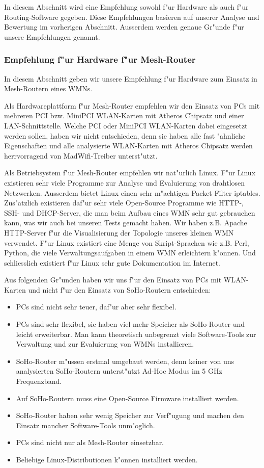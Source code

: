 In diesem Abschnitt wird eine Empfehlung sowohl f"ur Hardware als auch
f"ur Routing-Software gegeben. Diese Empfehlungen basieren auf unserer
Analyse und Bewertung im vorherigen Abschnitt. Ausserdem werden genaue Gr"unde
f"ur unsere Empfehlungen genannt.

\subsubsection{Empfehlung f"ur Hardware f"ur Mesh-Router}

In diesem Abschnitt geben wir unsere Empfehlung f"ur Hardware zum Einsatz in
Mesh-Routern eines WMNs.

Als Hardwareplattform f"ur Mesh-Router empfehlen wir den Einsatz von PCs mit
mehreren PCI bzw. MiniPCI WLAN-Karten mit Atheros Chipsatz und einer
LAN-Schnittstelle. Welche PCI oder MiniPCI WLAN-Karten dabei eingesetzt
werden sollen, haben wir nicht entschieden, denn sie haben alle fast
"ahnliche Eigenschaften und alle analysierte WLAN-Karten mit Atheros
Chipsatz werden herrvorragend von MadWifi-Treiber unterst"utzt.

Als Betriebsystem f"ur Mesh-Router empfehlen wir nat"urlich Linux.
F"ur Linux existieren sehr viele Programme zur Analyse und Evaluierung
von drahtlosen Netzwerken. Ausserdem bietet Linux einen sehr m"achtigen
Packet Filter iptables. Zus"atzlich existieren daf"ur sehr viele Open-Source
Programme wie HTTP-, SSH- und DHCP-Server, die man beim Aufbau eines WMN sehr
gut gebrauchen kann, was wir auch bei unseren Tests gemacht haben.
Wir haben z.B. Apache HTTP-Server f"ur die Visualisierung der Topologie
unseres kleinen WMN verwendet. F"ur Linux existiert eine Menge von
Skript-Sprachen wie z.B. Perl, Python, die viele Verwaltungsaufgaben
in einem WMN erleichtern k"onnen. Und schliesslich existiert f"ur Linux
sehr gute Dokumentation im Internet.

Aus folgenden Gr"unden haben wir uns f"ur den Einsatz von PCs mit
WLAN-Karten und nicht f"ur den Einsatz von SoHo-Routern entschieden:

\begin{itemize}
\item PCs sind nicht sehr teuer, daf"ur aber sehr flexibel.
\item PCs sind sehr flexibel, sie haben viel mehr Speicher als SoHo-Router
und leicht erweiterbar. Man kann theoretisch unbegrenzt viele Software-Tools
zur Verwaltung und zur Evaluierung von WMNs installieren.
\item SoHo-Router m"ussen erstmal umgebaut werden, denn keiner von uns
analysierten SoHo-Routern unterst"utzt Ad-Hoc Modus im 5 GHz Frequenzband.
\item Auf SoHo-Routern muss eine Open-Source Firmware installiert werden.
\item SoHo-Router haben sehr wenig Speicher zur Verf"ugung und machen
den Einsatz mancher Software-Tools unm"oglich.
\item PCs sind nicht nur als Mesh-Router einsetzbar.
\item Beliebige Linux-Distributionen k"onnen installiert werden.
\end{itemize}

